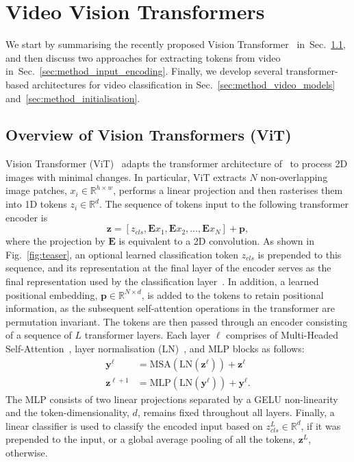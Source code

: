 \section{Video Vision Transformers}
\label{sec:method}

We start by summarising the recently proposed Vision Transformer~\cite{dosovitskiy_iclr_2021} in~Sec.~\ref{sec:method_background}, and then discuss two approaches for extracting tokens from video in~Sec.~\ref{sec:method_input_encoding}. Finally, we develop several transformer-based architectures for video classification in Sec.~\ref{sec:method_video_models} and~\ref{sec:method_initialisation}.


\subsection{Overview of Vision Transformers (ViT)}
\label{sec:method_background}



Vision Transformer (ViT)~\cite{dosovitskiy_iclr_2021} adapts the transformer architecture of~\cite{vaswani_neurips_2017} to process 2D images with minimal changes.
In particular, ViT extracts $N$ non-overlapping image patches, $x_i \in \mathbb{R}^{h \times w}$, %
performs a linear projection and then rasterises them into 1D tokens $z_i \in \mathbb{R}^d$. The sequence of tokens input to the following transformer encoder is
\begin{equation}
\mathbf{z} = [z_{cls}, \mathbf{E}x_1, \mathbf{E}x_2, \ldots , \mathbf{E}x_N] + \mathbf{p},
\label{eq:tokens}
\end{equation}
where the projection by $\mathbf{E}$ is equivalent to a 2D convolution.
As shown in Fig.~\ref{fig:teaser}, an optional learned classification token $z_{cls}$ is prepended to this sequence, and its representation at the final layer of the encoder serves as the final representation used by the classification layer~\cite{devlin_naacl_2019}.
In addition, a learned positional embedding, $\mathbf{p} \in \mathbb{R}^{N \times d}$, is added to the tokens to retain positional information, as the subsequent self-attention operations in the transformer are permutation invariant.
The tokens are then passed through an encoder consisting of a sequence of $L$ transformer layers.
Each layer $\ell$ comprises of Multi-Headed Self-Attention~\cite{vaswani_neurips_2017}, layer normalisation (LN)~\cite{ba_arxiv_2016}, and MLP blocks as follows:
\begin{align}
\mathbf{y}^{\ell} &= \text{MSA}(\text{LN}(\mathbf{z}^\ell)) +\mathbf{z}^\ell  \\
\mathbf{z}^{\ell + 1} &= \text{MLP}(\text{LN}(\mathbf{y}^\ell)) + \mathbf{y}^\ell.
\end{align}
The MLP consists of two linear projections separated by a GELU non-linearity~\cite{hendrycks_arxiv_2016} and the token-dimensionality, $d$, remains fixed throughout all layers.
Finally, a linear classifier is used to classify the encoded input based on $z_{cls}^L \in \mathbb{R}^d$, if it was prepended to the input, or a global average pooling of all the tokens, $\mathbf{z}^{L}$, otherwise. 


